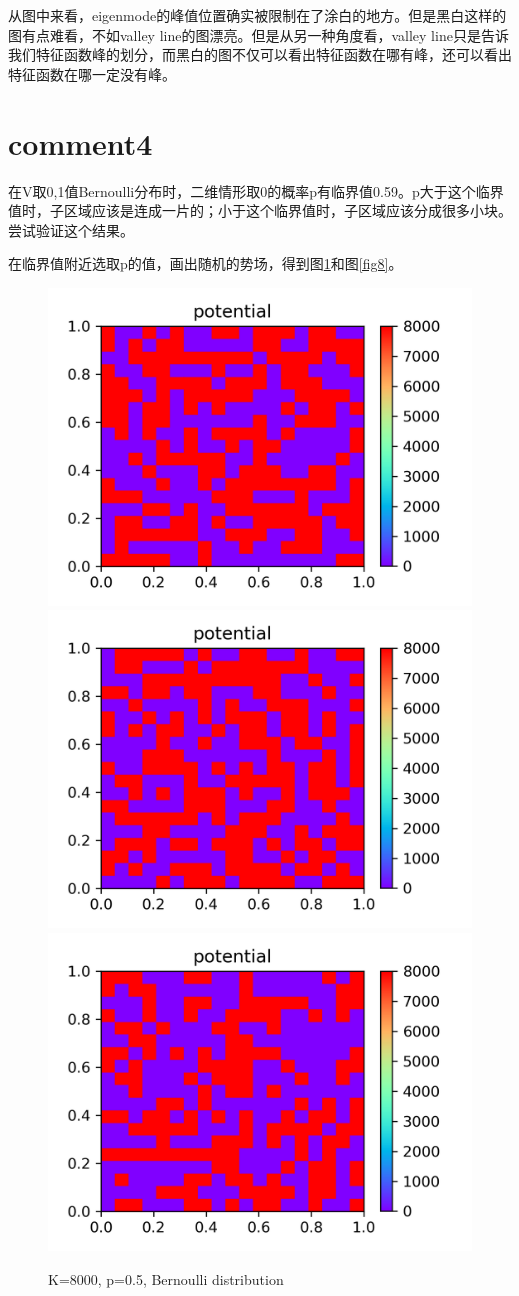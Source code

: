 \documentclass[UTF8,12pt]{article}
\begin{document}
从图中来看，eigenmode的峰值位置确实被限制在了涂白的地方。但是黑白这样的图有点难看，不如valley line的图漂亮。但是从另一种角度看，valley line只是告诉我们特征函数峰的划分，而黑白的图不仅可以看出特征函数在哪有峰，还可以看出特征函数在哪一定没有峰。

\section{comment4}

在V取{0,1}值Bernoulli分布时，二维情形取0的概率p有临界值0.59。p大于这个临界值时，子区域应该是连成一片的；小于这个临界值时，子区域应该分成很多小块。尝试验证这个结果。

在临界值附近选取p的值，画出随机的势场，得到图\ref{fig7}和图\ref{fig8}。

\begin{figure}[htbp]
    \centering
    \includegraphics[width=0.3\linewidth]{pic/v01}
    \includegraphics[width=0.3\linewidth]{pic/v02}
    \includegraphics[width=0.3\linewidth]{pic/v03}
    \caption{K=8000, p=0.5, Bernoulli distribution}
    \label{fig7}
\end{figure}
\end{document}
